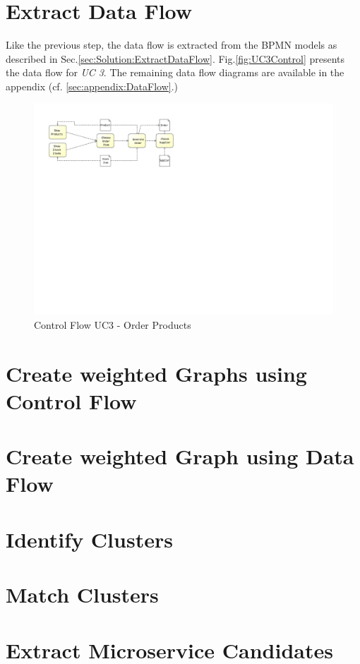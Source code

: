 \section{Extract Data Flow}

Like the previous step, the data flow is extracted from the BPMN models as described in Sec.\ref{sec:Solution:ExtractDataFlow}. Fig.\ref{fig:UC3Control} presents the data flow for \textit{UC 3}. The remaining data flow diagrams are available in the appendix (cf. \ref{sec:appendix:DataFlow}.)

\begin{figure}[h!]
	\centering
	\includegraphics[width=\textwidth, trim={5cm 14cm 6cm 2cm}]{img/UC3DFD.pdf}
	\caption{Control Flow UC3 - Order Products}
	\label{fig:UC3DFD}
\end{figure}

\section{Create weighted Graphs using Control Flow}

\section{Create weighted Graph using Data Flow}

\section{Identify Clusters}

\section{Match Clusters}

\section{Extract Microservice Candidates}